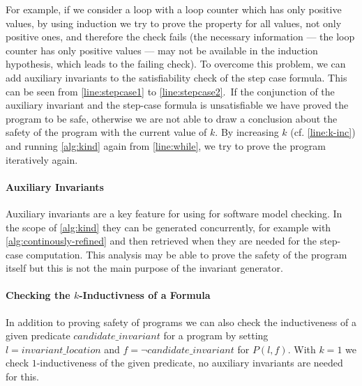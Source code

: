 For example, if we consider a loop with a loop counter which has only positive values, by using induction we try to prove the 
property for all values, not only positive ones, and therefore the check fails (the necessary information --- the loop counter has only positive values --- may not be available
in the induction hypothesis, which leads to the failing check).
To overcome this problem, we can add auxiliary invariants to the satisfiability check of the 
step case formula. This can be seen from \autoref{line:stepcase1} to \autoref{line:stepcase2}.\,
If the conjunction of the auxiliary invariant and the step-case formula is unsatisfiable we have proved the program to
be safe, otherwise we are not able to draw a conclusion about the safety of the program with the current value of $k$.
By increasing $k$ (cf. \autoref{line:k-inc}) and running \autoref{alg:kind} again from \autoref{line:while}, we try
to prove the program iteratively again.

\paragraph{Auxiliary Invariants}
Auxiliary invariants are a key feature for using \Kinduction{} for software model checking. In the scope of \autoref{alg:kind}
they can be generated concurrently, for example with \autoref{alg:continously-refined} and then retrieved when they are needed for the
step-case computation. This analysis may be able to prove the safety of the program itself but this is not the main purpose of
the invariant generator.

\paragraph{Checking the $k$-Inductivness of a Formula}\label{title:checkInd}
In addition to proving safety of programs we can also check the inductiveness of a given predicate $candidate\_invariant$ for
a program by setting $l = invariant\_location$ and $f = \neg candidate\_invariant$ for $P(l, f)$.
With $k = 1$ we check $1$-inductiveness of the given predicate, no auxiliary invariants are needed for this.


